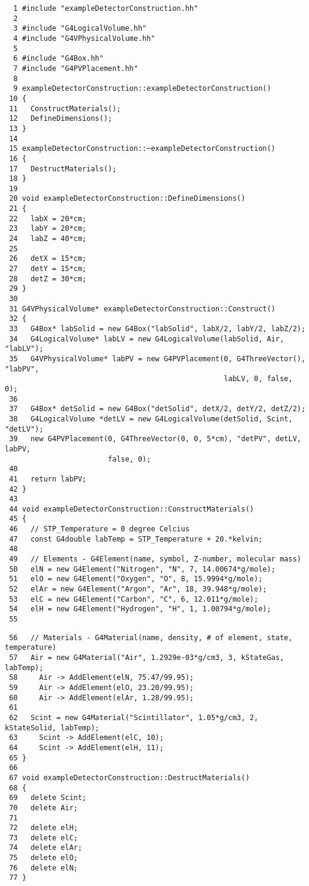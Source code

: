 \begin{code}[p]
\begin{lstlisting}
  1 #include "exampleDetectorConstruction.hh"
  2 
  3 #include "G4LogicalVolume.hh"
  4 #include "G4VPhysicalVolume.hh"
  5 
  6 #include "G4Box.hh"
  7 #include "G4PVPlacement.hh"
  8 
  9 exampleDetectorConstruction::exampleDetectorConstruction()
 10 {
 11   ConstructMaterials();
 12   DefineDimensions();
 13 }
 14 
 15 exampleDetectorConstruction::~exampleDetectorConstruction()
 16 {
 17   DestructMaterials();
 18 }
 19 
 20 void exampleDetectorConstruction::DefineDimensions()
 21 {
 22   labX = 20*cm;
 23   labY = 20*cm;
 24   labZ = 40*cm;
 25 
 26   detX = 15*cm;
 27   detY = 15*cm;
 28   detZ = 30*cm;
 29 }
 30 
 31 G4VPhysicalVolume* exampleDetectorConstruction::Construct()
 32 {
 33   G4Box* labSolid = new G4Box("labSolid", labX/2, labY/2, labZ/2);
 34   G4LogicalVolume* labLV = new G4LogicalVolume(labSolid, Air, "labLV");
 35   G4VPhysicalVolume* labPV = new G4PVPlacement(0, G4ThreeVector(), "labPV",
                                                   labLV, 0, false, 0);
 36 
 37   G4Box* detSolid = new G4Box("detSolid", detX/2, detY/2, detZ/2);
 38   G4LogicalVolume *detLV = new G4LogicalVolume(detSolid, Scint, "detLV");
 39   new G4PVPlacement(0, G4ThreeVector(0, 0, 5*cm), "detPV", detLV, labPV,
                        false, 0);
 40 
 41   return labPV;
 42 }
 43 
 44 void exampleDetectorConstruction::ConstructMaterials()
 45 {
 46   // STP_Temperature = 0 degree Celcius
 47   const G4double labTemp = STP_Temperature + 20.*kelvin;
 48 
 49   // Elements - G4Element(name, symbol, Z-number, molecular mass)
 50   elN = new G4Element("Nitrogen", "N", 7, 14.00674*g/mole);
 51   elO = new G4Element("Oxygen", "O", 8, 15.9994*g/mole);
 52   elAr = new G4Element("Argon", "Ar", 18, 39.948*g/mole);
 53   elC = new G4Element("Carbon", "C", 6, 12.011*g/mole);
 54   elH = new G4Element("Hydrogen", "H", 1, 1.00794*g/mole);
 55 
\end{lstlisting}
\caption{\texttt{exampleDetectorConstruction.cc} (Only Simulation - 1)
\label{code-3-8}}
\end{code}

\begin{code}
\begin{lstlisting}
 56   // Materials - G4Material(name, density, # of element, state, temperature)
 57   Air = new G4Material("Air", 1.2929e-03*g/cm3, 3, kStateGas, labTemp);
 58     Air -> AddElement(elN, 75.47/99.95);
 59     Air -> AddElement(elO, 23.20/99.95);
 60     Air -> AddElement(elAr, 1.28/99.95);
 61 
 62   Scint = new G4Material("Scintillator", 1.05*g/cm3, 2, kStateSolid, labTemp);
 63     Scint -> AddElement(elC, 10);
 64     Scint -> AddElement(elH, 11);
 65 }
 66 
 67 void exampleDetectorConstruction::DestructMaterials()
 68 {
 69   delete Scint;
 70   delete Air;
 71 
 72   delete elH;
 73   delete elC;
 74   delete elAr;
 75   delete elO;
 76   delete elN;
 77 }
\end{lstlisting}
\caption{\texttt{exampleDetectorConstruction.cc} (Only Simulation - 2)
\label{code-3-9}}
\end{code}

